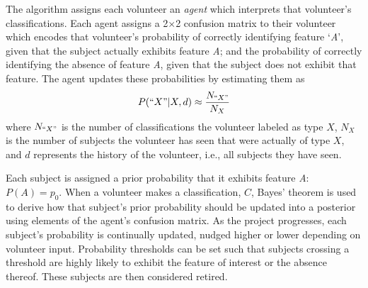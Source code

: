 \documentclass[twocolumn]{aastex6}
\newcommand{\A}{\textit{A}}
\newcommand{\N}{\textit{N}}
\begin{document}
The algorithm assigns each volunteer an \textit{agent} which interprets that volunteer's 
classifications. Each agent assigns a 2$\times$2 confusion matrix to their volunteer which encodes
that volunteer's probability of correctly identifying feature `\A',  given that the subject 
actually exhibits feature \A; and the probability of correctly identifying
the absence of feature \A, given that the subject does not exhibit 
that feature. The agent updates these probabilities by estimating them as 
\begin{equation}
P(``X" | X, d) \approx \frac{N_{``X"}}{N_{X}}
\end{equation}
where $N_{``X"}$ is the number of classifications the volunteer labeled as type $X$, 
$N_X$ is the number of subjects the volunteer has seen that were actually of type $X$,
and $d$ represents the history of the volunteer, i.e., all subjects they have seen. 





Each subject is assigned a prior probability that it exhibits feature \A: $P(A) = p_0$. 
When a volunteer makes a classification, $C$, Bayes' theorem is used to derive how 
that subject's prior probability should be updated into a posterior using elements
of the agent's confusion matrix. 
As the project progresses, each subject's probability is continually updated,
 nudged higher or lower depending on volunteer input.
Probability thresholds can be set such that subjects crossing a threshold
are highly likely to exhibit the feature of interest or the absence thereof. 
These subjects are then considered retired. 

\end{document}
